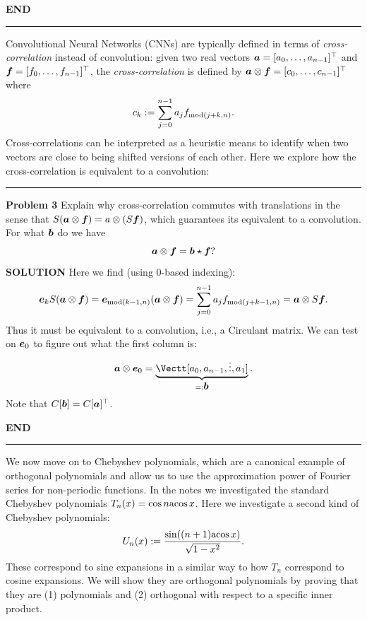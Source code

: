 \documentclass[12pt,a4paper]{article}
\def\a{ {\vc a} }
\def\b{ {\vc b} }
\def\e{ {\vc e} }
\def\f{ {\vc f} }
\def\acos{ {\rm acos}\, }
\begin{document}
\textbf{END}

\rule{\textwidth}{1pt}
Convolutional Neural Networks (CNNs) are typically defined in terms of \emph{cross-correlation} instead of convolution: given two real vectors $\ensuremath{\bm{\a}} = [a_0,\ensuremath{\ldots},a_{n-1}]^\ensuremath{\top}$ and $\ensuremath{\bm{\f}} = [f_0,\ensuremath{\ldots},f_{n-1}]^\ensuremath{\top}$, the \emph{cross-correlation} is defined by $\ensuremath{\bm{\a}} \ensuremath{\otimes} \ensuremath{\bm{\f}} = [c_0,\ensuremath{\ldots},c_{n-1}]^\ensuremath{\top}$ where
\[
c_k := \ensuremath{\sum}_{j=0}^{n-1} a_j f_{{\rm mod}(j+k,n)}.
\]
Cross-correlations can be interpreted as a heuristic means to identify when two vectors are close to being shifted versions of each other. Here we explore how the cross-correlation is equivalent to a convolution:

\rule{\textwidth}{1pt}
\textbf{Problem 3}  Explain why cross-correlation commutes with translations in the sense that $S(\ensuremath{\bm{\a}} \ensuremath{\otimes} \ensuremath{\bm{\f}} ) = a \ensuremath{\otimes} (S\ensuremath{\bm{\f}})$, which guarantees its equivalent to a convolution. For what $\ensuremath{\bm{\b}}$ do we have
\[
\ensuremath{\bm{\a}} \ensuremath{\otimes} \ensuremath{\bm{\f}}  = \ensuremath{\bm{\b}} \ensuremath{\star} \ensuremath{\bm{\f}}?
\]
\textbf{SOLUTION} Here we find (using 0-based indexing):
\[
\ensuremath{\bm{\e}}_k S(\ensuremath{\bm{\a}} \ensuremath{\otimes} \ensuremath{\bm{\f}} ) = \ensuremath{\bm{\e}}_{{\rm mod}(k-1,n)} (\ensuremath{\bm{\a}} \ensuremath{\otimes} \ensuremath{\bm{\f}} ) = \ensuremath{\sum}_{j=0}^{n-1} a_j f_{{\rm mod}(j+k-1,n)} = \ensuremath{\bm{\a}} \ensuremath{\otimes} S \ensuremath{\bm{\f}}.
\]
Thus it must be equivalent to a convolution, i.e., a Circulant matrix. We can test on $\ensuremath{\bm{\e}}_0$ to figure out what the first column is:
\[
\ensuremath{\bm{\a}} \ensuremath{\otimes} \ensuremath{\bm{\e}}_0 = \underbrace{\Vectt[
a_0,
a_{n-1},
\ensuremath{\vdots},
a_1
]}_{=: \ensuremath{\bm{\b}}}.
\]
Note that $C[\ensuremath{\bm{\b}}] = C[\ensuremath{\bm{\a}}]^\ensuremath{\top}$.

\textbf{END}

\rule{\textwidth}{1pt}
We now move on to Chebyshev polynomials, which are a canonical example of orthogonal polynomials and allow us to use the approximation power of Fourier series for non-periodic functions. In the notes we investigated the standard Chebyshev polynomials $T_n(x) = \cos n \acos x$. Here we investigate a second kind of Chebyshev polynomials:
\[
U_n(x) := {\sin((n+1) \acos x) \over \sqrt{1-x^2}}.
\]
These correspond to sine expansions in a similar way to how $T_n$ correspond to cosine expansions. We will show they are orthogonal polynomials by proving that they are (1) polynomials and (2) orthogonal with respect to a specific inner product.
\end{document}
